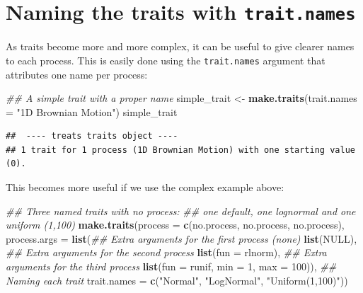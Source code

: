 \documentclass[
]{book}
\newenvironment{Shaded}{\begin{snugshade}}{\end{snugshade}}
\newcommand{\CommentTok}[1]{\textcolor[rgb]{0.56,0.35,0.01}{\textit{#1}}}
\newcommand{\DataTypeTok}[1]{\textcolor[rgb]{0.13,0.29,0.53}{#1}}
\newcommand{\DecValTok}[1]{\textcolor[rgb]{0.00,0.00,0.81}{#1}}
\newcommand{\KeywordTok}[1]{\textcolor[rgb]{0.13,0.29,0.53}{\textbf{#1}}}
\newcommand{\NormalTok}[1]{#1}
\newcommand{\OtherTok}[1]{\textcolor[rgb]{0.56,0.35,0.01}{#1}}
\newcommand{\StringTok}[1]{\textcolor[rgb]{0.31,0.60,0.02}{#1}}
\begin{document}
\hypertarget{naming-the-traits-with-trait.names}{%
\section{\texorpdfstring{Naming the traits with \texttt{trait.names}}{Naming the traits with trait.names}}\label{naming-the-traits-with-trait.names}}

As traits become more and more complex, it can be useful to give clearer names to each process.
This is easily done using the \texttt{trait.names} argument that attributes one name per process:

\begin{Shaded}
\begin{Highlighting}[]
\CommentTok{\#\# A simple trait with a proper name}
\NormalTok{simple\_trait \textless{}{-}}\StringTok{ }\KeywordTok{make.traits}\NormalTok{(}\DataTypeTok{trait.names =} \StringTok{"1D Brownian Motion"}\NormalTok{)}
\NormalTok{simple\_trait}
\end{Highlighting}
\end{Shaded}

\begin{verbatim}
##  ---- treats traits object ---- 
## 1 trait for 1 process (1D Brownian Motion) with one starting value (0).
\end{verbatim}

This becomes more useful if we use the complex example above:

\begin{Shaded}
\begin{Highlighting}[]
\CommentTok{\#\# Three named traits with no process:}
\CommentTok{\#\# one default, one lognormal and one uniform (1,100)}
\KeywordTok{make.traits}\NormalTok{(}\DataTypeTok{process      =} \KeywordTok{c}\NormalTok{(no.process, no.process, no.process),}
            \DataTypeTok{process.args =} \KeywordTok{list}\NormalTok{(}\CommentTok{\#\# Extra arguments for the first process (none)}
                                \KeywordTok{list}\NormalTok{(}\OtherTok{NULL}\NormalTok{),}
                                \CommentTok{\#\# Extra arguments for the second process}
                                \KeywordTok{list}\NormalTok{(}\DataTypeTok{fun =}\NormalTok{ rlnorm),}
                                \CommentTok{\#\# Extra arguments for the third process}
                                \KeywordTok{list}\NormalTok{(}\DataTypeTok{fun =}\NormalTok{ runif, }\DataTypeTok{min =} \DecValTok{1}\NormalTok{, }\DataTypeTok{max =} \DecValTok{100}\NormalTok{)),}
            \CommentTok{\#\# Naming each trait}
            \DataTypeTok{trait.names  =} \KeywordTok{c}\NormalTok{(}\StringTok{"Normal"}\NormalTok{, }\StringTok{"LogNormal"}\NormalTok{, }\StringTok{"Uniform(1,100)"}\NormalTok{))}
\end{Highlighting}
\end{Shaded}
\end{document}
